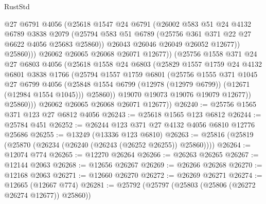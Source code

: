 \begin{lexlean}{RustStd}
\begin{coremodule}
                      @27
                      @6791
                      @4056
                      (@25618
                        @1547
                        @24
                        @6791
                        (@26002
                          @583
                          @51
                          @24
                          @4132
                          @6789
                          @3838
                          @2079
                          (@25794
                            @583
                            @51
                            @6789
                            (@25756 @361 @371 @22 @27 @6622 @4056 @25683 @25860))
                          @26043
                          @26046
                          @26049
                          @26052
                          @12677))
                      @25860)))
                @26062
                @26065
                @26068
                @26071
                @12677))
            (@25756
              @1558
              @371
              @24
              @27
              @6803
              @4056
              (@25618
                @1558
                @24
                @6803
                (@25829
                  @1557
                  @1759
                  @24
                  @4132
                  @6801
                  @3838
                  @1766
                  (@25794
                    @1557
                    @1759
                    @6801
                    (@25756
                      @1555
                      @371
                      @1045
                      @27
                      @6799
                      @4056
                      (@25848 @1554 @6799 (@12978 (@12979 @6799)) (@12671 (@12984 @1554 @1045)))
                      @25860))
                  @19070
                  @19073
                  @19076
                  @19079
                  @12677))
              @25860)))
        @26062
        @26065
        @26068
        @26071
        @12677))
@26240 := @25756 @1565 @371 @123 @27 @6812 @4056
@26243 := @25618 @1565 @123 @6812
@26244 := @25784 @451
@26252 := @26244 @123 @371 @27 @4132 @4056 @6810 @12776 @25686
@26255 := @13249 (@13336 @123 @6810)
@26263 := @25816 (@25819 (@25870 (@26234 (@26240 (@26243 (@26252 @26255)) @25860))))
@26264 := @12074 @774
@26265 := @12270 @26264
@26266 := @26263 @26265
@26267 := @12144 @2063
@26268 := @12656 @26267
@26269 := @26266 @26268
@26270 := @12168 @2063
@26271 := @12660 @26270
@26272 := @26269 @26271
@26274 := @12665 (@12667 @774)
@26281 := @25792 (@25797 (@25803 (@25806 (@26272 @26274 @12677)) @25860))

\end{coremodule}
\end{lexlean}
